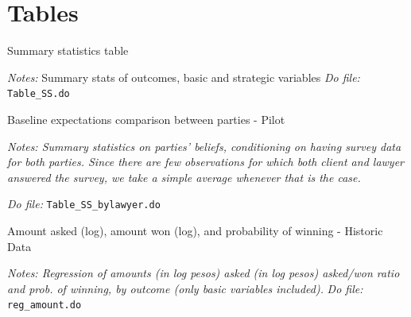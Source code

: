 \documentclass[11pt]{article}
\begin{document}



\pagebreak
\nocite{*}

%
%
\printbibliography



\section{Tables}


\begin{table}[H]
    \caption{Summary statistics table }
    \label{tab:SS}
    \begin{center}
        \tiny{}
    \end{center}
    \footnotesize
    \textit{Notes:} 
Summary stats of outcomes, basic and strategic variables
    \textit{Do file: } \texttt{Table\_SS.do}
\end{table}



\begin{table}[H]
    \caption{Baseline expectations comparison between parties - Pilot}
    \label{Table_expectations_plaintiff_defendant}
    \begin{center}
       \scriptsize{}
    \end{center}
    \footnotesize    
    \textit{Notes: Summary statistics on parties' beliefs, conditioning on having survey data for both parties. Since there are few observations for which both client and lawyer answered the survey, we take a simple average whenever that is the case.} 
    
    \textit{Do file: } \texttt{Table\_SS\_bylawyer.do}
\end{table}

\pagebreak


\begin{table}[H]
    \caption{Amount asked (log), amount won (log), and probability of winning - Historic Data}
    \label{Table_Reg_winnings_log}
    \begin{center}
        \scriptsize{}
    \end{center}
    \footnotesize
    \textit{Notes: Regression of amounts (in log pesos) asked (in log pesos) asked/won ratio and prob. of winning, by outcome (only basic variables included).} 
    \textit{Do file: } \texttt{reg\_amount.do}
\end{table}
\end{document}
